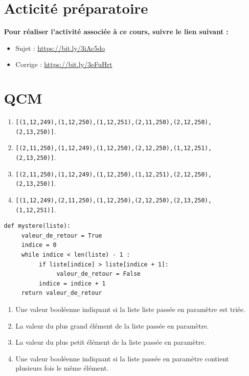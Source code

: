 \section{Acticité préparatoire}
\textbf{Pour réaliser l'activité associée à ce cours, suivre le lien suivant : }
\begin{itemize} 
\item Sujet : \url{https://bit.ly/3iAc5do}
\item Corrige : \url{https://bit.ly/3eFuHrt}
\end{itemize}

\newpage
\section{QCM}
\begin{enumerate}
\item \texttt{[(1,12,249),(1,12,250),(1,12,251),(2,11,250),(2,12,250),(2,13,250)]}.
\item \texttt{[(2,11,250),(1,12,249),(1,12,250),(2,12,250),(1,12,251),(2,13,250)]}.%
\item \texttt{[(2,11,250),(1,12,249),(1,12,250),(1,12,251),(2,12,250),(2,13,250)]}.
\item \texttt{[(1,12,249),(2,11,250),(1,12,250),(2,12,250),(2,13,250),(1,12,251)]}.
\end{enumerate}

\begin{lstlisting}
def mystere(liste):
     valeur_de_retour = True
     indice = 0
     while indice < len(liste) - 1 :
          if liste[indice] > liste[indice + 1]:
               valeur_de_retour = False
          indice = indice + 1
     return valeur_de_retour
\end{lstlisting}
\begin{enumerate}
\item Une valeur booléenne indiquant si la liste liste passée en paramètre est triée. %
\item La valeur du plus grand élément de la liste passée en paramètre.
\item La valeur du plus petit élément de la liste passée en paramètre.
\item Une valeur booléenne indiquant si la liste passée en paramètre contient plusieurs fois le même élément.
\end{enumerate}

